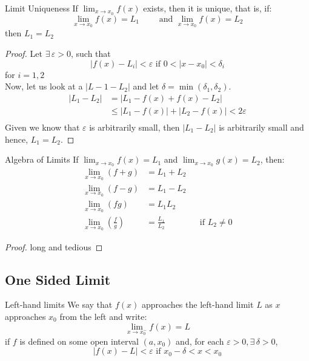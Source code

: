 \documentclass{article}
\renewcommand{\d}{\delta}
\newcommand{\e}{\varepsilon}
\newcommand{\ex}{\exists\,}
\begin{document}
\begin{theorem}{Limit Uniqueness}{}
  If $\displaystyle{\lim_{x\to x_0}{f(x)}}$ exists, then it is unique, that is, if:
  $$ \lim_{x\to x_0}{f(x)} = L_1 \qquad\text{ and }\lim_{x\to x_0}{f(x)} = L_2 $$
  then $\displaystyle{L_1 = L_2}$
\end{theorem}
\begin{proof}
  Let $\ex\e>0$, such that
  $$ |f(x) - L_i| < \e \text{ if } 0 < |x - x_0| < \d_i $$
  for $i=1, 2$\\

  Now, let us look at a $|L-1 - L_2|$ and let $\d = \min(\d_1, \d_2)$.
  \begin{align*}
    |L_1 - L_2| &= |L_1 - f(x) + f(x) - L_2| \\
    &\le |L_1 - f(x)| + |L_2 - f(x)| < 2\e \\
  \end{align*}
  Given we know that $\e$ is arbitrarily small, then $|L_1 - L_2|$ is arbitrarily small and hence, $L_1 = L_2$.
\end{proof}

\begin{theorem}{Algebra of Limits}{}
  If $\lim_{x\to x_0}{f(x)} = L_1$ and $\lim_{x\to x_0}{g(x)} = L_2$, then:
  \begin{align*}
    \lim_{x\to x_0}{(f + g)} &= L_1 + L_2 \\
    \lim_{x\to x_0}{(f - g)} &= L_1 - L_2 \\
    \lim_{x\to x_0}{(fg)} &= L_1L_2 \\
    \lim_{x\to x_0}{\left(\frac{f}{g}\right)} &= \frac{L_1}{L_2} && \text{if $L_2\neq 0$}
  \end{align*}
\end{theorem}
\begin{proof}
  long and tedious
\end{proof}

\subsection{One Sided Limit}
\noindent\begin{definition}{Left-hand limits}{}
We say that $f(x)$ approaches the left-hand limit $L$ as $x$ approaches $x_0$ from the left and write:
$$ \lim_{x\to x_0^{-}}{f(x)} = L $$
if $f$ is defined on some open interval $(a, x_0)$ and, for each $\e>0, \ex \d > 0$,
$$ |f(x) - L|<\e \text{ if } x_0 - \d < x < x_0$$
\end{definition}\vspace{10pt}
\end{document}
